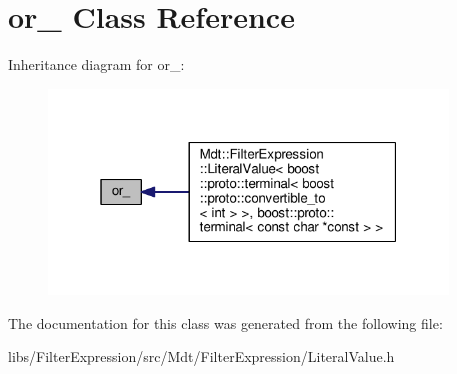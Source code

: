 \hypertarget{classboost_1_1proto_1_1or__}{}\section{or\+\_\+ Class Reference}
\label{classboost_1_1proto_1_1or__}


Inheritance diagram for or\+\_\+\+:
\nopagebreak
\begin{figure}[H]
\begin{center}
\leavevmode
\includegraphics[width=301pt]{classboost_1_1proto_1_1or____inherit__graph}
\end{center}
\end{figure}


The documentation for this class was generated from the following file\+:\begin{DoxyCompactItemize}
\item 
libs/\+Filter\+Expression/src/\+Mdt/\+Filter\+Expression/Literal\+Value.\+h\end{DoxyCompactItemize}

